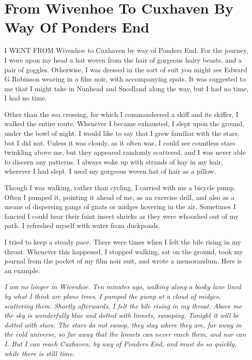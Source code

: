\chapter{From Wivenhoe To Cuxhaven By Way Of Ponders End}

I WENT FROM Wivenhoe to Cuxhaven by way of Ponders End. For the journey, I wore upon my head a hat woven from the hair of gorgeous hairy beasts, and a pair of goggles. Otherwise, I was dressed in the sort of suit you might see Edward G Robinson wearing in a film noir, with accompanying spats. It was suggested to me that I might take in Nunhead and Snodland along the way, but I had no time, I had no time.

Other than the sea crossing, for which I commandeered a skiff and its skiffer, I walked the entire route. Whenever I became exhausted, I slept upon the ground, under the bowl of night. I would like to say that I grew familiar with the stars, but I did not. Unless it was cloudy, as it often was, I could see countless stars twinkling above me, but they appeared randomly scattered, and I was never able to discern any patterns. I always woke up with strands of hay in my hair, wherever I had slept. I used my gorgeous woven hat of hair as a pillow.

Though I was walking, rather than cycling, I carried with me a bicycle pump. Often I pumped it, pointing it ahead of me, as an exercise drill, and also as a means of dispersing gangs of gnats or midges hovering in the air. Sometimes I fancied I could hear their faint insect shrieks as they were whooshed out of my path. I refreshed myself with water from duckponds.

I tried to keep a steady pace. There were times when I felt the bile rising in my throat. Whenever this happened, I stopped walking, sat on the ground, took my journal from the pocket of my film noir suit, and wrote a memorandum. Here is an example:

\emph{I am no longer in Wivenhoe. Ten minutes ago, walking along a bosky lane lined by what I think are plane trees, I pumped the pump at a cloud of midges, scattering them. Shortly afterwards, I felt the bile rising in my throat. Above me the sky is wonderfully blue and dotted with linnets, swooping. Tonight it will be dotted with stars. The stars do not swoop, they stay where they are, far away in the cold universe, so far away that the linnets can never reach them, and nor can I. But I can reach Cuxhaven, by way of Ponders End, and must do so quickly, while there is still time.}

